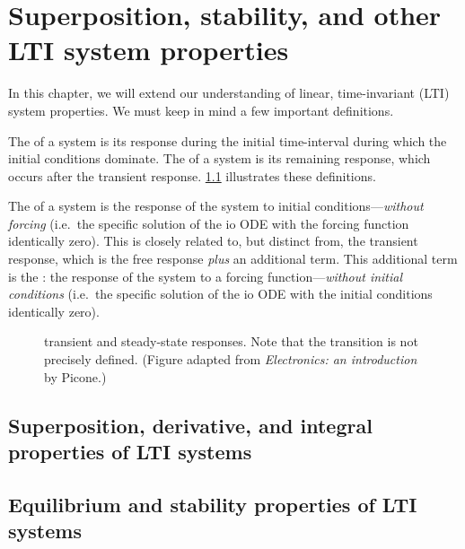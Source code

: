 \documentclass[dynamic_systems.tex]{subfiles}
\begin{document}
\chapter[Superposition, stability, etc.]{Superposition, stability, and other LTI system properties}
\tags{}

In this chapter, we will extend our understanding of linear, time-invariant (LTI) system properties.
We must keep in mind a few important definitions.
\tags{}

The  of a system is its response during the initial time-interval during which the initial conditions dominate.
The  of a system is its remaining response, which occurs after the transient response.
\cref{fig:transient_steady_responses} illustrates these definitions.
\tags{}

The  of a system is the response of the system to initial conditions---\emph{without forcing} (i.e.\ the specific solution of the io ODE with the forcing function identically zero).
This is closely related to, but distinct from, the transient response, which is the free response \emph{plus} an additional term.
This additional term is the : the response of the system to a forcing function---\emph{without initial conditions} (i.e.\ the specific solution of the io ODE with the initial conditions identically zero).
\tags{}

\begin{figure}[H]
\centering

\vspace{-.5\baselineskip}
\caption{transient and steady-state responses. Note that the transition is not precisely defined. (Figure adapted from \emph{Electronics: an introduction} by Picone.)}
\label{fig:transient_steady_responses}
\end{figure}

\section[Superposition, derivative, and integral properties]{Superposition, derivative, and integral properties of LTI systems}
\tags{}
\label{lec:LTI_properties}



\section[Equilibrium and stability properties]{Equilibrium and stability properties of LTI systems}
\tags{}
\end{document}
